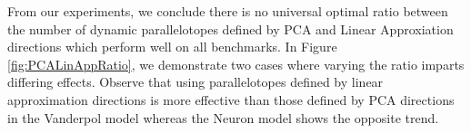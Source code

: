 
From our experiments, we conclude there is no universal optimal ratio between the number of dynamic parallelotopes defined by PCA and Linear Approxiation directions which perform well on all benchmarks. In Figure \ref{fig:PCALinAppRatio}, we demonstrate two cases where varying the ratio imparts differing effects. Observe that using parallelotopes defined by linear approximation directions is more effective than those defined by PCA directions in the Vanderpol model whereas the Neuron model shows the opposite trend.

%
